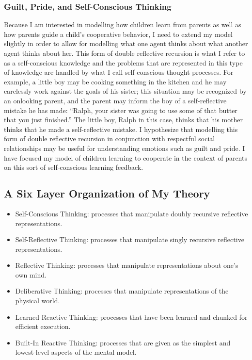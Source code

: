\subsubsection{Guilt, Pride, and Self-Conscious Thinking}

Because I am interested in modelling how children learn from parents
as well as how parents guide a child's cooperative behavior, I need
to extend my model slightly in order to allow for modelling what one
agent thinks about what another agent thinks about her. This form of
double reflective recursion is what I refer to as a self-conscious
knowledge and the problems that are represented in this type of
knowledge are handled by what I call self-conscious thought
processes. For example, a little boy may be cooking something in the
kitchen and he may carelessly work against the goals of his sister;
this situation may be recognized by an onlooking parent, and the
parent may inform the boy of a self-reflective mistake he has made:
``Ralph, your sister was going to use some of that butter that you just
finished.'' The little boy, Ralph in this case, thinks that his mother
thinks that he made a self-reflective mistake. I hypothesize that
modelling this form of double reflective recursion in conjunction with
respectful social relationships may be useful for understanding
emotions such as guilt and pride. I have focused my model of
children learning to cooperate in the context of parents on this sort
of self-conscious learning feedback.

\subsection{A Six Layer Organization of My Theory}

\begin{itemize}
\item{Self-Conscious Thinking: processes that manipulate doubly recursive reflective representations.}
\item{Self-Reflective Thinking: processes that manipulate singly recursive reflective representations.}
\item{Reflective Thinking: processes that manipulate representations about one's own mind.}
\item{Deliberative Thinking: processes that manipulate representations of the physical world.}
\item{Learned Reactive Thinking: processes that have been learned and chunked for efficient execution.}
\item{Built-In Reactive Thinking: processes that are given as the simplest and lowest-level aspects of the mental model.}
\end{itemize}

